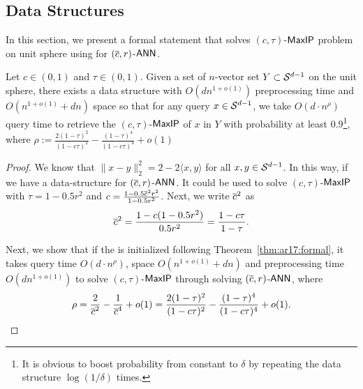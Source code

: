 






\subsection{Data Structures}\label{sec:data_structure}

In this section, we present a formal statement that solves $(c,\tau)$-$\mathsf{MaxIP}$ problem on unit sphere using {\lsh} for $(\overline{c},r)$-$\mathsf{ANN}$.

\begin{theorem}[%
]\label{coro:maxip_lsh_formal}
Let $c \in (0,1)$ and $\tau \in(0,1)$. Given a set of $n$-vector set $Y \subset {\cal S}^{d-1}$ on the unit sphere, there exists a data structure with $O(d n^{1+o(1)})$ preprocessing time and $O(n^{1+o(1)} + d n)$ space so that for any query $x \in {\cal S}^{d-1}$, we take $O(d\cdot n^{\rho})$ query time to retrieve the $(c,\tau)$-$\mathsf{MaxIP}$ of $x$ in $Y$ with probability at least $0.9$\footnote{It is obvious to boost probability from constant to $\delta$ by repeating the data structure $\log(1/\delta)$ times.}, where $\rho:=  \frac{2(1-\tau)^2}{(1-c\tau)^2}-\frac{(1-\tau)^4}{(1-c\tau)^4}+o(1)$
\end{theorem}

\begin{proof}
We know that $\|x-y\|_2^2= 2 - 2\langle x , y\rangle$ for all $x,y\in {\cal S}^{d-1}$. In this way,  if we have a {\lsh} data-structure for $(\overline{c}, r)$-$\mathsf{ANN}$. It could be used to solve $(c, \tau)$-$\mathsf{MaxIP}$ with $\tau = 1-0.5 r^2$ and $c = \frac{1-0.5 \overline{c}^2 r^2}{1 - 0.5 r^2}$. Next, we write $\overline{c}^2$ as
\begin{align*}
\overline{c}^2= \frac{ 1 - c(1-0.5 r^2) }{0.5r^2} = \frac{1 - c \tau }{1-\tau} .
\end{align*}


Next, we show that if  the {\lsh} is initialized following Theorem~\ref{thm:ar17:formal}, it takes query time $O(d \cdot n^{\rho})$, space $O(n^{1+o(1)} + d n)$ and preprocessing time $O(dn^{1+o(1)})$ to solve $(c,\tau)$-$\mathsf{MaxIP}$ through solving $(\overline{c}, r)$-$\mathsf{ANN}$,   where
\begin{align*}
    \rho =  \frac{2}{\overline{c}^2} -\frac{1}{\overline{c}^4} +o(1) = \frac{2(1-\tau)^2}{(1-c\tau)^2}-\frac{(1-\tau)^4}{(1-c\tau)^4}+o(1). 
\end{align*}
\end{proof}




